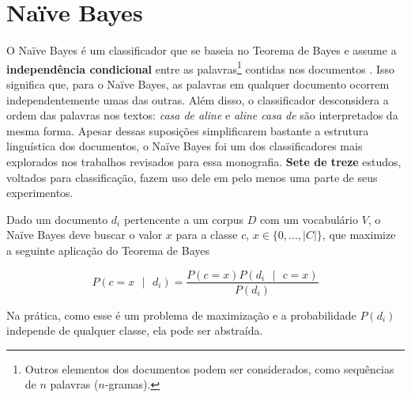 \section{Naïve Bayes}
\label{subsection:naive}



O Naïve Bayes é um classificador que se baseia no Teorema de Bayes e assume a \textbf{independência condicional} entre as palavras\footnote{Outros elementos dos documentos podem ser considerados, como sequências de \ensuremath{n} palavras (\ensuremath{n}-gramas).} contidas nos documentos \cite{naive-forty}. Isso significa que, para o Naïve Bayes, as palavras em qualquer documento ocorrem independentemente umas das outras. Além disso, o classificador desconsidera a ordem das palavras nos textos: \emph{casa de aline} e \emph{aline casa de} são interpretados da mesma forma. Apesar dessas suposições simplificarem bastante a estrutura linguística dos documentos, o Naïve Bayes foi um dos classificadores mais explorados nos trabalhos revisados para essa monografia. \textbf{Sete de treze} estudos, voltados para classificação, fazem uso dele em pelo menos uma parte de seus experimentos. 


Dado um documento \ensuremath{d_i} pertencente a um corpus \ensuremath{D} com um vocabulário \ensuremath{V}, o Naïve Bayes deve buscar o valor \ensuremath{x} para a classe \ensuremath{c}, \ensuremath{x \in \{0, ..., |C|\}}, que maximize a seguinte aplicação do Teorema de Bayes \cite{naive-forty}

\begin{equation}
\label{teorema-bayes}
\ensuremath{P(c = x\mbox{ }|\mbox{ }d_i) = \frac{P(c = x)P(d_i\mbox{ }|\mbox{ }c = x)}{P(d_i)}}
\end{equation}



Na prática, como esse é um problema de maximização e a probabilidade \ensuremath{P(d_i)} independe de qualquer classe, ela pode ser abstraída. 

